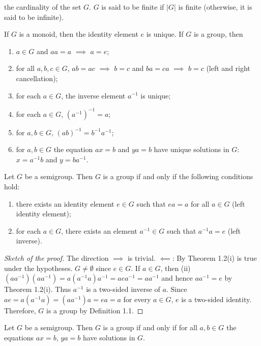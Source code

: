 the cardinality of the set $G$. $G$ is said to be finite if $|G|$ is
finite (otherwise, it is said to be infinite).
\begin{theorem}[1.2]
If $G$ is a monoid, then the identity element $e$ is unique. If $G$ is a
group, then
\begin{enumerate}[label=\textnormal{(\alph*)}]
\item $a\in G$ and $aa=a$ $\implies$ $a=e$;
\item for all $a,b,c\in G$, $ab=ac$ $\implies$ $b=c$ and $ba=ca$ $\implies$
  $b=c$ (left and right cancellation);
\item for each $a\in G$, the inverse element $a^{-1}$ is unique;
\item for each $a\in G$, $\left( a^{-1} \right)^{-1}=a$;
\item for $a,b\in G$, $(ab)^{-1}=b^{-1}a^{-1}$;
\item for $a,b\in G$ the equation $ax=b$ and $ya=b$ have unique solutions
  in $G$: $x=a^{-1}b$ and $y=ba^{-1}$.
\end{enumerate}
\end{theorem}

\begin{proposition}[1.3]
Let $G$ be a semigroup. Then $G$ is a group if and only if the following
conditions hold:
\begin{enumerate}[label=\textnormal{(\roman*)}]
\item there exists an identity element $e\in G$ such that $ea=a$ for all
  $a\in G$ (left identity element);
\item for each $a\in G$, there exists an element $a^{-1}\in G$ such that
  $a^{-1}a=e$ (left inverse).
\end{enumerate}
\end{proposition}
\begin{proof}[Sketch of the proof]
The direction $\implies$ is trivial. $\impliedby$: By Theorem 1.2(i) is
true under the hypotheses. $G\neq\emptyset$ since $e\in G$. If $a\in G$,
then (ii) $(aa^{-1})(aa^{-1})=a(a^{-1}a)a^{-1}=aea^{-1}=aa^{-1}$ and hence
$aa^{-1}=e$ by Theorem 1.2(i). Thus $a^{-1}$ is a two-sided inverse of
$a$. Since $ae=a(a^{-1}a)=(aa^{-1})a=ea=a$ for every $a\in G$, $e$ is a
two-sided identity. Therefore, $G$ is a group by Definition 1.1.
\end{proof}
\begin{proposition}[1.4]
Let $G$ be a semigroup. Then $G$ is a group if and only if for all $a,b\in
G$ the equations $ax=b$, $ya=b$ have solutions in $G$.
\end{proposition}

